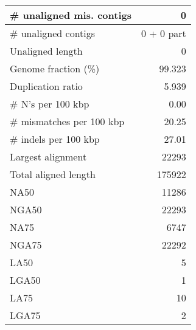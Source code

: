 \documentclass[12pt,a4paper]{article}
\begin{document}
\begin{table}[ht]
\begin{center}
\begin{tabular}{|l*{1}{|r}|}
\# unaligned mis. contigs & 0 \\ \hline
\# unaligned contigs & 0 + 0 part \\ \hline
Unaligned length & 0 \\ \hline
Genome fraction (\%) & 99.323 \\ \hline
Duplication ratio & 5.939 \\ \hline
\# N's per 100 kbp & 0.00 \\ \hline
\# mismatches per 100 kbp & 20.25 \\ \hline
\# indels per 100 kbp & 27.01 \\ \hline
Largest alignment & 22293 \\ \hline
Total aligned length & 175922 \\ \hline
NA50 & 11286 \\ \hline
NGA50 & 22293 \\ \hline
NA75 & 6747 \\ \hline
NGA75 & 22292 \\ \hline
LA50 & 5 \\ \hline
LGA50 & 1 \\ \hline
LA75 & 10 \\ \hline
LGA75 & 2 \\ \hline
\end{tabular}
\end{center}
\end{table}
\end{document}
